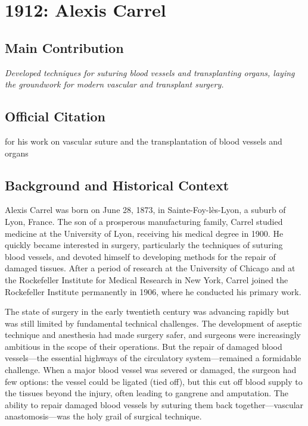 \chapter[1912 --- Carrel]{1912: Alexis Carrel}
\label{ch:1912_alexiscarrel}

\section*{Main Contribution}

\textit{Developed techniques for suturing blood vessels and transplanting organs, laying the groundwork for modern vascular and transplant surgery.}\cite{nobel-1912,lecture-1912}

\section{Official Citation}

for his work on vascular suture and the transplantation of blood vessels and organs

\section{Background and Historical Context}

Alexis Carrel was born on June 28, 1873, in Sainte-Foy-l\`es-Lyon, a suburb of Lyon, France. The son of a prosperous manufacturing family, Carrel studied medicine at the University of Lyon, receiving his medical degree in 1900. He quickly became interested in surgery, particularly the techniques of suturing blood vessels, and devoted himself to developing methods for the repair of damaged tissues. After a period of research at the University of Chicago and at the Rockefeller Institute for Medical Research in New York, Carrel joined the Rockefeller Institute permanently in 1906, where he conducted his primary work.

The state of surgery in the early twentieth century was advancing rapidly but was still limited by fundamental technical challenges. The development of aseptic technique and anesthesia had made surgery safer, and surgeons were increasingly ambitious in the scope of their operations. But the repair of damaged blood vessels---the essential highways of the circulatory system---remained a formidable challenge. When a major blood vessel was severed or damaged, the surgeon had few options: the vessel could be ligated (tied off), but this cut off blood supply to the tissues beyond the injury, often leading to gangrene and amputation. The ability to repair damaged blood vessels by suturing them back together---vascular anastomosis---was the holy grail of surgical technique.

